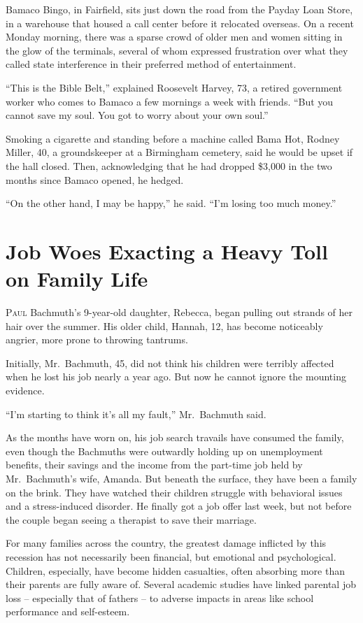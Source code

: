 ﻿\documentclass[12pt]{article}
\begin{document}
Bamaco Bingo, in Fairfield, sits just down the road from the Payday Loan Store, in a warehouse that
housed a call center before it relocated overseas. On a recent Monday morning, there was a sparse
crowd of older men and women sitting in the glow of the terminals, several of whom expressed
frustration over what they called state interference in their preferred method of entertainment.

``This is the Bible Belt,'' explained Roosevelt Harvey, 73, a retired government worker who comes to
Bamaco a few mornings a week with friends. ``But you cannot save my soul. You got to worry about
your own soul.''

Smoking a cigarette and standing before a machine called Bama Hot, Rodney Miller, 40, a
groundskeeper at a Birmingham cemetery, said he would be upset if the hall closed. Then,
acknowledging that he had dropped \$3,000 in the two months since Bamaco opened, he hedged.

``On the other hand, I may be happy,'' he said. ``I'm losing too much money.''

\section{Job Woes Exacting a Heavy Toll on Family Life}

\lettrine{P}{aul} Bachmuth's 9-year-old daughter, Rebecca, began pulling out
strands of her hair over the summer. His older child, Hannah, 12, has become noticeably angrier,
more prone to throwing tantrums.

Initially, Mr.~Bachmuth, 45, did not think his children were terribly affected when he lost his job
nearly a year ago. But now he cannot ignore the mounting evidence.

``I'm starting to think it's all my fault,'' Mr.~Bachmuth said.

As the months have worn on, his job search travails have consumed the family, even though the
Bachmuths were outwardly holding up on unemployment benefits, their savings and the income from the
part-time job held by Mr.~Bachmuth's wife, Amanda. But beneath the surface, they have been a family
on the brink. They have watched their children struggle with behavioral issues and a stress-induced
disorder. He finally got a job offer last week, but not before the couple began seeing a therapist
to save their marriage.

For many families across the country, the greatest damage inflicted by this recession has not
necessarily been financial, but emotional and psychological. Children, especially, have become
hidden casualties, often absorbing more than their parents are fully aware of. Several academic
studies have linked parental job loss -- especially that of fathers -- to adverse impacts in areas
like school performance and self-esteem.
\end{document}
